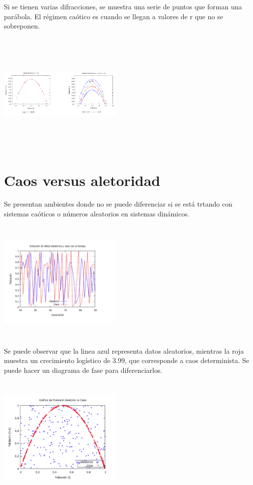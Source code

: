\documentclass{article}
\begin{document}
Si se tienen varias difracciones, se muestra una serie de puntos que forman una parábola. El régimen caótico es cuando se llegan a valores de r que no se sobreponen.

\begin{center}
\includegraphics[width=6cm, height=6cm]{Im7.png}
\end{center}

\section{Caos versus aletoridad}

Se presentan ambientes donde no se puede diferenciar si se está trtando con sistemas caóticos o números aleatorios en sistemas dinámicos.

\begin{center}
\includegraphics[width=6cm, height=6cm]{Im8.png}
\end{center}

Se puede observar que la linea azul representa datos aleatorios, mientras la roja muestra un crecimiento logístico de 3.99, que corresponde a caos determinista. Se puede hacer un diagrama de fase para diferenciarlos.

\begin{center}
\includegraphics[width=6cm, height=6cm]{Im9.png}
\end{center}
\end{document}
